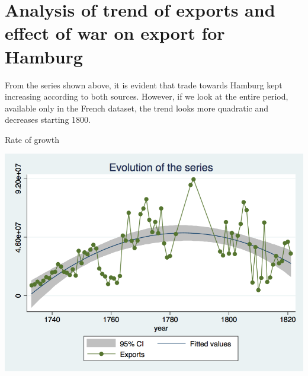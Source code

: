 \documentclass[12pt,a4paper,titlepage]{article}
\begin{document}
\section{Analysis of trend of exports and effect of war on export for Hamburg}
From the series shown above, it is evident that trade towards Hamburg kept increasing according to both sources. However, if we look at the entire period, available only in the French dataset, the trend looks more quadratic and decreases starting 1800. 
\begin{center}
\caption{Rate of growth}
\includegraphics[scale=.3]{growth_rate.png}
\end{center}
\end{document}
